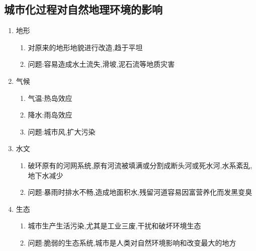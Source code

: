 \documentclass[a4paper]{article}
\begin{document}
    \subsection{城市化过程对自然地理环境的影响}
    \begin{enumerate}
        \item 地形
        \begin{enumerate}
            \item 对原来的地形地貌进行改造,趋于平坦
            \item 问题:容易造成水土流失,滑坡,泥石流等地质灾害
        \end{enumerate}
        \item 气候
        \begin{enumerate}
            \item 气温:热岛效应
            \item 降水:雨岛效应
            \item 问题:城市风,扩大污染
        \end{enumerate}
        \item 水文
        \begin{enumerate}
            \item 破环原有的河网系统,原有河流被填满或分割成断头河或死水河,水系紊乱,地下水减少
            \item 问题:暴雨时排水不畅,造成地面积水,残留河道容易因富营养化而发黑变臭
        \end{enumerate}
        \item 生态
        \begin{enumerate}
            \item 城市生产生活污染,尤其是工业三废,干扰和破坏环境生态
            \item 问题:脆弱的生态系统,城市是人类对自然环境影响和改变最大的地方
        \end{enumerate}
    \end{enumerate}
\end{document}

